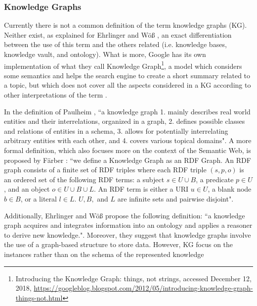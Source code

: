 \documentclass[runningheads]{llncs}
\begin{document}
\subsubsection{Knowledge Graphs} \label{knowledge-graphs}
Currently there is not a common definition of the term knowledge graphs
(KG). Neither exist, as explained for Ehrlinger and W{\"o}{\ss}
\cite{Ehrlinger}, an exact differentiation between the use of this term and the others related (i.e. knowledge bases, knowledge vault, and
ontology). What is more, Google has its own implementation of what they
call Knowledge Graph\footnote{Introducing the Knowledge Graph: things, not strings, accessed December 12, 2018, \href{https://googleblog.blogspot.com/2012/05/introducing-knowledge-graph-things-not.html}
{https://googleblog.blogspot.com/2012/05/introducing-knowledge-graph-things-not.html}}, 
a model which considers some semantics and helps the search engine to create a short summary related to a topic, but which does not cover all
the aspects considered in a KG according to other interpretations of
the term \cite{Ehrlinger}.

In the definition of Paulheim \cite{Paulheim}, ``a knowledge graph
1. mainly describes real world entities and their interrelations, organized in a graph, 2. defines possible classes and relations of entities in a schema, 3. allows for potentially interrelating arbitrary entities with each other, and 4. covers various topical domains". A more formal definition, which also focuses more on the context of the Semantic Web, is proposed by F{\"a}rber \cite{Farber}: ``we define a Knowledge Graph as an RDF Graph. An RDF graph consists of a finite set of RDF triples where each RDF triple $(s, p, o)$ is an ordered set of the following RDF terms: a subject $s \in U ∪ B$, a predicate $p \in U$, and an object $o \in U ∪ B ∪ L$. An RDF term is either a URI $u \in U$, a blank node $b \in B$, or a literal $l \in L$. $U, B,$ and $L$ are infinite sets and pairwise disjoint".

Additionally, Ehrlinger and W{\"o}{\ss} \cite{Ehrlinger} propose the following definition: ``a knowledge graph acquires and integrates information into an ontology and applies a reasoner to derive new knowledge.". Moreover, they suggest that knowledge graphs involve the use of a graph-based structure to store data. However, KG focus on the instances rather than on the schema of the represented knowledge \cite{Paulheim}
\end{document}

